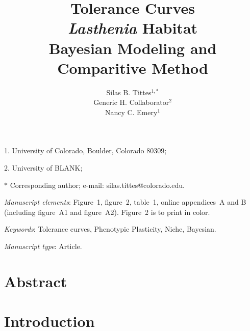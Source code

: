 \documentclass[11pt]{article}
\title{Tolerance Curves \\
\textit{Lasthenia} Habitat \\
Bayesian Modeling and Comparitive Method
}
\author{Silas B. Tittes$^{1,\ast}$ \\ 
Generic H. Collaborator$^{2}$ \\ 
Nancy C. Emery$^{1}$}
\date{}
\begin{document}
\maketitle

\noindent{}1. University of Colorado, Boulder, Colorado 80309;

\noindent{}2. University of BLANK;

\noindent{}$\ast$ Corresponding author; e-mail: silas.tittes@colorado.edu.


\bigskip

\textit{Manuscript elements}: Figure~1, figure~2, table~1, online
appendices~A and B (including figure~A1 and figure~A2). Figure~2 is to
print in color.

\bigskip

\textit{Keywords}: Tolerance curves, Phenotypic Plasticity, Niche, Bayesian.

\bigskip

\textit{Manuscript type}: Article. 

\bigskip


\linenumbers{}
\modulolinenumbers[3]

\newpage{}

\section*{Abstract}


\newpage{}

\section*{Introduction}



\end{document}
